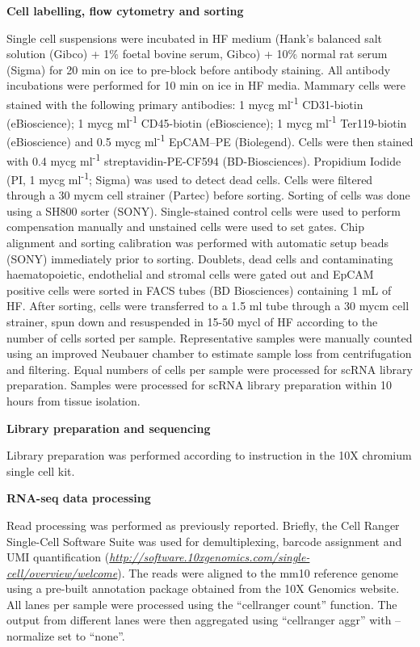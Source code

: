 \documentclass[titlepage, 12pt, oneside]{amsart}
\begin{document}
\textbf{Cell labelling, flow cytometry and sorting}

Single cell suspensions were incubated in HF medium (Hank's balanced salt solution (Gibco) + 1\% foetal bovine serum, Gibco) + 10\% normal rat serum (Sigma) for 20 min on ice to pre-block before antibody staining.
All antibody incubations were performed for 10 min on ice in HF media.
Mammary cells were stained with the following primary antibodies: 1 mycg ml\textsuperscript{-1} CD31-biotin (eBioscience); 1 mycg ml\textsuperscript{-1} CD45-biotin (eBioscience); 1 mycg ml\textsuperscript{-1} Ter119-biotin (eBioscience) and 0.5 mycg ml\textsuperscript{-1} EpCAM--PE (Biolegend).
Cells were then stained with 0.4 mycg ml\textsuperscript{-1} streptavidin-PE-CF594 (BD-Biosciences).
Propidium Iodide (PI, 1 mycg ml\textsuperscript{-1}; Sigma) was used to detect dead cells.
Cells were filtered through a 30 mycm cell strainer (Partec) before sorting.
Sorting of cells was done using a SH800 sorter (SONY).
Single-stained control cells were used to perform compensation manually and unstained cells were used to set gates.
Chip alignment and sorting calibration was performed with automatic setup beads (SONY) immediately prior to sorting.
Doublets, dead cells and contaminating haematopoietic, endothelial and stromal cells were gated out and EpCAM positive cells were sorted in FACS tubes (BD Biosciences) containing 1 mL of HF.
After sorting, cells were transferred to a 1.5 ml tube through a 30 mycm cell strainer, spun down and resuspended in 15-50 mycl of HF according to the number of cells sorted per sample.
Representative samples were manually counted using an improved Neubauer chamber to estimate sample loss from centrifugation and filtering.
Equal numbers of cells per sample were processed for scRNA library preparation.
Samples were processed for scRNA library preparation within 10 hours from tissue isolation.

\textbf{Library preparation and sequencing}

Library preparation was performed according to instruction in the 10X chromium single cell kit.

\textbf{RNA-seq data processing }

Read processing was performed as previously reported\autocite{Zheng2017}.
Briefly, the Cell Ranger Single-Cell Software Suite was used for demultiplexing, barcode assignment and UMI quantification (\href{http://software.10xgenomics.com/single-cell/overview/welcome}{\textit{http://software.10xgenomics.com/single-cell/overview/welcome}}).
The reads were aligned to the mm10 reference genome using a pre-built annotation package obtained from the 10X Genomics website.
All lanes per sample were processed using the ``cellranger count'' function.
The output from different lanes were then aggregated using ``cellranger aggr'' with --normalize set to ``none''.
\end{document}
